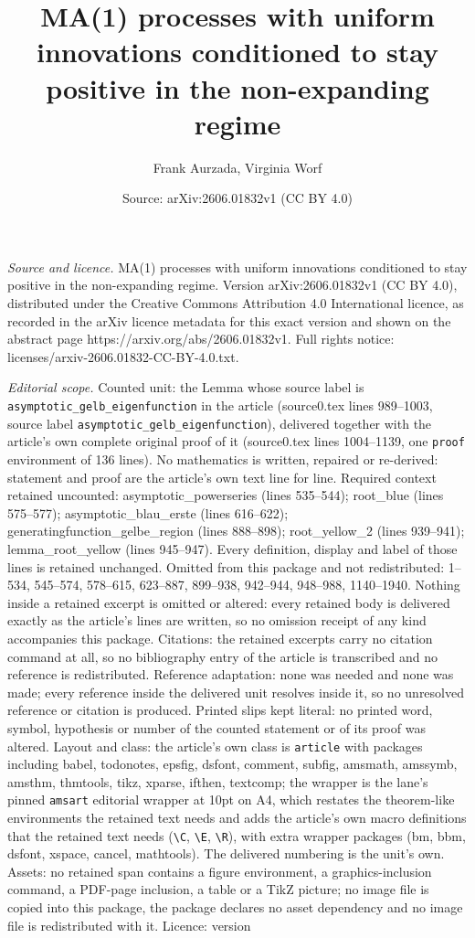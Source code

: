 \documentclass[10pt,a4paper]{amsart}
\title[MA(1) processes with uniform innovations conditioned to stay]{MA(1) processes with uniform innovations conditioned to stay positive in the non-expanding regime}
\author{Frank Aurzada, Virginia Worf}
\date{Source: arXiv:2606.01832v1 (CC BY 4.0)}
\begin{document}
\maketitle

\noindent\emph{Source and licence.} MA(1) processes with uniform innovations conditioned to stay positive in the non-expanding regime. Version arXiv:2606.01832v1 (CC BY 4.0), distributed under the Creative Commons Attribution 4.0 International licence, as recorded in the arXiv licence metadata for this exact version and shown on the abstract page https://arxiv.org/abs/2606.01832v1. Full rights notice: licenses/arxiv-2606.01832-CC-BY-4.0.txt.\par\smallskip

\noindent\textit{Editorial scope.} Counted unit: the Lemma whose source label is \texttt{asymptotic\_gelb\_eigenfunction} in the article (source0.tex lines 989--1003, source label \texttt{asymptotic\_gelb\_eigenfunction}), delivered together with the article's own complete original proof of it (source0.tex lines 1004--1139, one \texttt{proof} environment of 136 lines). No mathematics is written, repaired or re-derived: statement and proof are the article's own text line for line. Required context retained uncounted: asymptotic\_powerseries (lines 535--544); root\_blue (lines 575--577); asymptotic\_blau\_erste (lines 616--622); generatingfunction\_gelbe\_region (lines 888--898); root\_yellow\_2 (lines 939--941); lemma\_root\_yellow (lines 945--947). Every definition, display and label of those lines is retained unchanged. Omitted from this package and not redistributed: 1--534, 545--574, 578--615, 623--887, 899--938, 942--944, 948--988, 1140--1940. Nothing inside a retained excerpt is omitted or altered: every retained body is delivered exactly as the article's lines are written, so no omission receipt of any kind accompanies this package. Citations: the retained excerpts carry no citation command at all, so no bibliography entry of the article is transcribed and no reference is redistributed. Reference adaptation: none was needed and none was made; every reference inside the delivered unit resolves inside it, so no unresolved reference or citation is produced. Printed slips kept literal: no printed word, symbol, hypothesis or number of the counted statement or of its proof was altered. Layout and class: the article's own class is \texttt{article} with packages including babel, todonotes, epsfig, dsfont, comment, subfig, amsmath, amssymb, amsthm, thmtools, tikz, xparse, ifthen, textcomp; the wrapper is the lane's pinned \texttt{amsart} editorial wrapper at 10pt on A4, which restates the theorem-like environments the retained text needs and adds the article's own macro definitions that the retained text needs (\texttt{\textbackslash C}, \texttt{\textbackslash E}, \texttt{\textbackslash R}), with extra wrapper packages (bm, bbm, dsfont, xspace, cancel, mathtools). The delivered numbering is the unit's own. Assets: no retained span contains a figure environment, a graphics-inclusion command, a PDF-page inclusion, a table or a TikZ picture; no image file is copied into this package, the package declares no asset dependency and no image file is redistributed with it. Licence: version 
\end{document}
